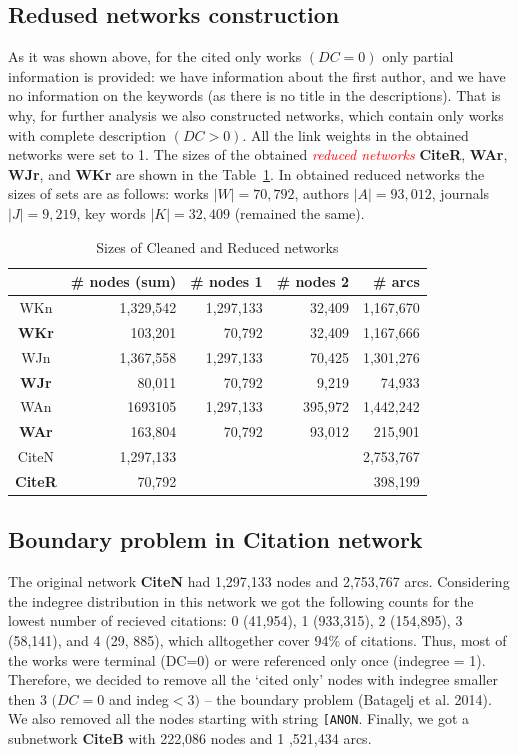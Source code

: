 \documentclass[11pt]{article} %
\newcommand{\keyw}[1]{\textcolor{red}{\emph{#1}}}
\begin{document}
\subsection{Redused networks construction}

As it was shown above, for the cited only  works  $(DC=0)$ only partial information is provided: we have information about the first author, and we have no information on the keywords (as there is no title in the descriptions). That is why, for further analysis we also constructed networks, which contain only works with complete description $(DC>0)$. All the link weights in the obtained networks were set to 1. The sizes of the obtained \keyw{reduced networks} \textbf{CiteR}, \textbf{WAr}, \textbf{WJr}, and \textbf{WKr} are shown in the Table~\ref{rednet}. In obtained reduced networks  the sizes of sets are as follows: works $|W| = 70,792$, authors $|A| = 93,012$, journals $|J| = 9,219$, key words $|K| = 32,409$ (remained the same).\medskip 

\begin{table}
\caption{Sizes of Cleaned and Reduced networks}\label{rednet}\medskip
\begin{center}
\begin{tabular}{c|r|r|r|r}
	&\# nodes (sum)	& \# nodes 1	&\# nodes 2	& \# arcs \\ \hline		 
WKn &  	1,329,542	& 1,297,133	& 32,409	& 1,167,670 \\
\textbf{WKr}	& 103,201	& 70,792	& 32,409	& 1,167,666 \\ \hline	
WJn & 	1,367,558	& 1,297,133	& 70,425	& 1,301,276 \\ 
\textbf{WJr} 	& 80,011	& 70,792	& 9,219	& 74,933 \\ \hline	
WAn	& 1693105	& 1,297,133	& 395,972	& 1,442,242 \\ 
\textbf{WAr}	& 163,804	& 70,792	& 93,012	& 215,901 \\ \hline	
CiteN & 1,297,133 & & & 2,753,767\\ 
\textbf{CiteR} & 70,792 & & & 398,199 \\ \hline
\end{tabular}				
\end{center}
\end{table}

\subsection{Boundary problem in Citation network}

The original network \textbf{CiteN} had 1,297,133 nodes and 2,753,767 arcs. Considering the indegree distribution in this network we got the following  counts for the lowest number of recieved citations: 0 (41,954), 1 (933,315), 2 (154,895), 3 (58,141), and 4 (29, 885), which alltogether  cover 94\% of citations. Thus, most of the works were terminal (DC=0) or were referenced only once (indegree = 1). Therefore, we decided to remove all the `cited only' nodes with indegree smaller then 3 $(DC = 0$ and indeg$<3)$ -- the boundary problem (Batagelj et al. 2014). We also removed all the nodes starting with string \texttt{[ANON}.  Finally, we got a subnetwork \textbf{CiteB} with  222,086 nodes and 1 ,521,434 arcs.
			
\end{document}
